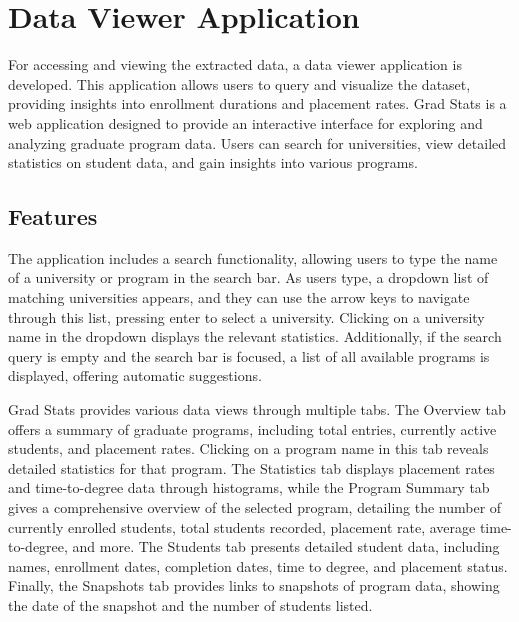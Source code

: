 \documentclass[11pt]{article}
\begin{document}

\section{Data Viewer Application}

    For accessing and viewing the extracted data, a data viewer application is developed. This application allows users to query and visualize the dataset, providing insights into enrollment durations and placement rates.
Grad Stats is a web application designed to provide an interactive interface for exploring and analyzing graduate program data. Users can search for universities, view detailed statistics on student data, and gain insights into various programs.

\subsection{Features}

The application includes a search functionality, allowing users to type the name of a university or program in the search bar. As users type, a dropdown list of matching universities appears, and they can use the arrow keys to navigate through this list, pressing enter to select a university. Clicking on a university name in the dropdown displays the relevant statistics. Additionally, if the search query is empty and the search bar is focused, a list of all available programs is displayed, offering automatic suggestions.

Grad Stats provides various data views through multiple tabs. The Overview tab offers a summary of graduate programs, including total entries, currently active students, and placement rates. Clicking on a program name in this tab reveals detailed statistics for that program. The Statistics tab displays placement rates and time-to-degree data through histograms, while the Program Summary tab gives a comprehensive overview of the selected program, detailing the number of currently enrolled students, total students recorded, placement rate, average time-to-degree, and more. The Students tab presents detailed student data, including names, enrollment dates, completion dates, time to degree, and placement status. Finally, the Snapshots tab provides links to snapshots of program data, showing the date of the snapshot and the number of students listed.
\end{document}
